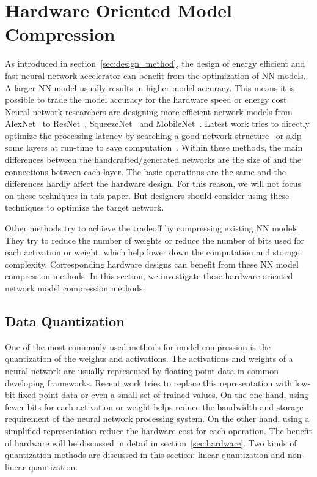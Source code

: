 \section{Hardware Oriented Model Compression}\label{sec:software}

As introduced in section~\ref{sec:design_method}, the design of energy efficient and fast neural network accelerator can benefit from the optimization of NN models. A larger NN model usually results in higher model accuracy. This means it is possible to trade the model accuracy for the hardware speed or energy cost. Neural network researchers are designing more efficient network models from AlexNet~\cite{krizhevsky2012imagenet} to ResNet~\cite{he2016deep}, SqueezeNet~\cite{iandola2016squeezenet} and MobileNet~\cite{Howard2017MobileNets}. Latest work tries to directly optimize the processing latency by searching a good network structure~\cite{tan2018mnasnet} or skip some layers at run-time to save computation~\cite{wang2017skipnet}. Within these methods, the main differences between the handcrafted/generated networks are the size of and the connections between each layer. The basic operations are the same and the differences hardly affect the hardware design. For this reason, we will not focus on these techniques in this paper. But designers should consider using these techniques to optimize the target network.

Other methods try to achieve the tradeoff by compressing existing NN models. They try to reduce the number of weights or reduce the number of bits used for each activation or weight, which help lower down the computation and storage complexity. Corresponding hardware designs can benefit from these NN model compression methods. In this section, we investigate these hardware oriented network model compression methods.

\subsection{Data Quantization}\label{sec:software:quant}
One of the most commonly used methods for model compression is the quantization of the weights and activations. The activations and weights of a neural network are usually represented by floating point data in common developing frameworks. Recent work tries to replace this representation with low-bit fixed-point data or even a small set of trained values. On the one hand, using fewer bits for each activation or weight helps reduce the bandwidth and storage requirement of the neural network processing system. On the other hand, using a simplified representation reduce the hardware cost for each operation. The benefit of hardware will be discussed in detail in section~\ref{sec:hardware}. Two kinds of quantization methods are discussed in this section: linear quantization and non-linear quantization.

